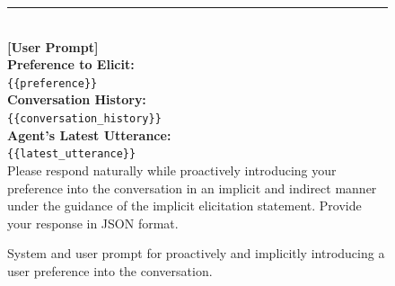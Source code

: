 \begin{figure}[t]
{\begin{tcolorbox}[colback=blue!5!white, colframe=blue!75!black, 
title=System and User Prompt for Proactively Introducing Preferences, boxrule=0.3mm, width=\textwidth, arc=3mm, auto outer arc=true]
\rule{\linewidth}{0.2pt} \\

\textbf{[User Prompt]}\\[3mm]
\textbf{Preference to Elicit:}\\
\texttt{\{\{preference\}\}}\\[1mm]

\textbf{Conversation History:}\\
\texttt{\{\{conversation\_history\}\}}\\[1mm]

\textbf{Agent's Latest Utterance:}\\
\texttt{\{\{latest\_utterance\}\}}\\[1mm]

Please respond naturally while proactively introducing your preference into the conversation in an implicit and indirect manner under the guidance of the implicit elicitation statement. Provide your response in JSON format.

\end{tcolorbox}
}
\caption{System and user prompt for proactively and implicitly introducing a user preference into the conversation.}
\label{fig:response_elicit_prompt}
\end{figure}


